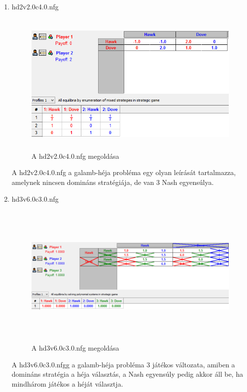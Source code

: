 \begin{enumerate}
\item hd2v2.0c4.0.nfg
		\begin{figure}[h]
		\begin{center}
		\includegraphics[height=7cm]{figures/hd2v2.png}
		\caption{A hd2v2.0c4.0.nfg megoldása}
		\end{center}
		\end{figure}
A hd2v2.0c4.0.nfg a galamb-héja probléma egy olyan leírását tartalmazza, amelynek nincsen domináns stratégiája, de van 3 Nash egyensúlya.
		
\item hd3v6.0c3.0.nfg
		\begin{figure}[h]
		\begin{center}
		\includegraphics[height=7cm]{figures/hd3_dom.png}
		\caption{A hd3v6.0c3.0.nfg megoldása}
		\end{center}
		\end{figure}
A hd3v6.0c3.0.nfgg a galamb-héja probléma 3 játékos változata, amiben a domináns stratégia a héja választás, a Nash egyensúly pedig akkor áll be, ha mindhárom játékos a héját választja.


\end{enumerate}
